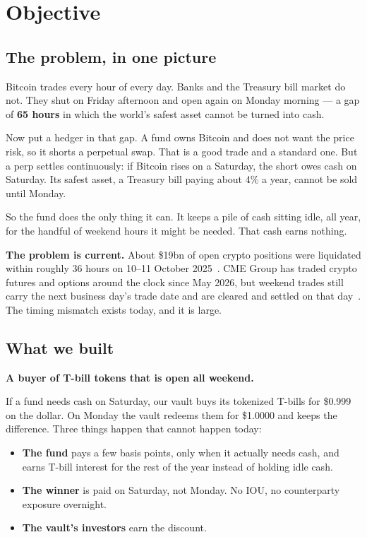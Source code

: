 \documentclass[11pt,a4paper]{article}
\newcommand{\cbox}[1]{%
  \begin{center}\colorbox{panel}{\parbox{0.95\textwidth}{\vspace{3pt}#1\vspace{3pt}}}\end{center}}
\begin{document}
\clearpage
\tableofcontents
\clearpage

\section{Objective}\label{sec:objective}

\subsection{The problem, in one picture}

Bitcoin trades every hour of every day. Banks and the Treasury bill market do not. They shut on
Friday afternoon and open again on Monday morning — a gap of \textbf{65 hours} in which the world's
safest asset cannot be turned into cash.

Now put a hedger in that gap. A fund owns Bitcoin and does not want the price risk, so it shorts a
perpetual swap. That is a good trade and a standard one. But a perp settles continuously: if Bitcoin
rises on a Saturday, the short owes cash on Saturday. Its safest asset, a Treasury bill paying about
4\% a year, cannot be sold until Monday.

So the fund does the only thing it can. It keeps a pile of cash sitting idle, all year, for the
handful of weekend hours it might be needed. That cash earns nothing.

\cbox{\textbf{The problem is current.} About \$19bn of open crypto positions were liquidated within
roughly 36 hours on 10--11 October 2025~\cite{rockawayx}. CME Group has traded crypto futures and
options around the clock since May 2026, but weekend trades still carry the next business day's trade
date and are cleared and settled on that day~\cite{cmeclear,cmelaunch}. The timing mismatch exists
today, and it is large.}

\subsection{What we built}

\textbf{A buyer of T-bill tokens that is open all weekend.}

If a fund needs cash on Saturday, our vault buys its tokenized T-bills for \$0.999 on the dollar. On
Monday the vault redeems them for \$1.0000 and keeps the difference. Three things happen that
cannot happen today:

\begin{itemize}
  \item \textbf{The fund} pays a few basis points, only when it actually needs cash, and earns T-bill
  interest for the rest of the year instead of holding idle cash.
  \item \textbf{The winner} is paid on Saturday, not Monday. No IOU, no counterparty exposure
  overnight.
  \item \textbf{The vault's investors} earn the discount.
\end{itemize}
\end{document}
